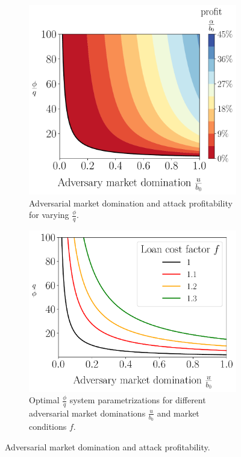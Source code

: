 \begin{figure}[htb]
  \centering
  \begin{subfigure}{0.49\textwidth}
    \centering
    \includegraphics[width=\textwidth]{./plots/plotu.pdf}
    \caption{Adversarial market domination and attack profitability
             for varying $\frac{\phi}{q}$.}
    \label{fig:contour-plotu}
  \end{subfigure}
  \hfill
  \begin{subfigure}{0.49\textwidth}
    \centering
    \includegraphics[width=\textwidth]{./plots/multiplef_plotu.pdf}
    \caption{Optimal $\frac{\phi}{q}$ system parametrizations
             for different adversarial market dominations $\frac{u}{b_0}$
             and market conditions $f$.}
    \label{fig:compare-f-plotu}
  \end{subfigure}
  \caption{Adversarial market domination and attack profitability.}
  \label{fig:plotu}
\end{figure}

